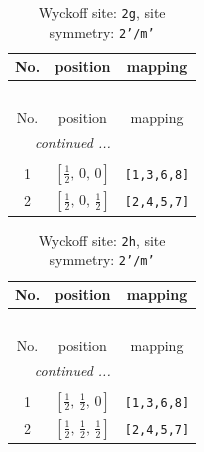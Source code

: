 \documentclass[fleqn,8pt]{jsarticle}
\begin{document}
\begin{longtable}{ccc}
\caption{Wyckoff site: {\tt 2g}, site symmetry: {\tt 2'/m'}}
 \\
 \hline \hline
No. & position & mapping \\ \hline \endfirsthead

\multicolumn{2}{l}{\tablename\ \thetable{}} \\
 \hline \hline
No. & position & mapping \\ \hline \endhead

 \hline \hline
\multicolumn{2}{r}{\footnotesize\it continued ...} \\ \endfoot

 \hline \hline
\multicolumn{2}{r}{} \\ \endlastfoot

1 & $\left[ \frac{1}{2},\, 0,\, 0 \right]$ & {\tt [1,3,6,8]} \\ \hline
2 & $\left[ \frac{1}{2},\, 0,\, \frac{1}{2} \right]$ & {\tt [2,4,5,7]} \\
\end{longtable}
\renewcommand{\arraystretch}{1.2}
\begin{longtable}{ccc}
\caption{Wyckoff site: {\tt 2h}, site symmetry: {\tt 2'/m'}}
 \\
 \hline \hline
No. & position & mapping \\ \hline \endfirsthead

\multicolumn{2}{l}{\tablename\ \thetable{}} \\
 \hline \hline
No. & position & mapping \\ \hline \endhead

 \hline \hline
\multicolumn{2}{r}{\footnotesize\it continued ...} \\ \endfoot

 \hline \hline
\multicolumn{2}{r}{} \\ \endlastfoot

1 & $\left[ \frac{1}{2},\, \frac{1}{2},\, 0 \right]$ & {\tt [1,3,6,8]} \\ \hline
2 & $\left[ \frac{1}{2},\, \frac{1}{2},\, \frac{1}{2} \right]$ & {\tt [2,4,5,7]} \\
\end{longtable}
\renewcommand{\arraystretch}{1.2}
\end{document}
